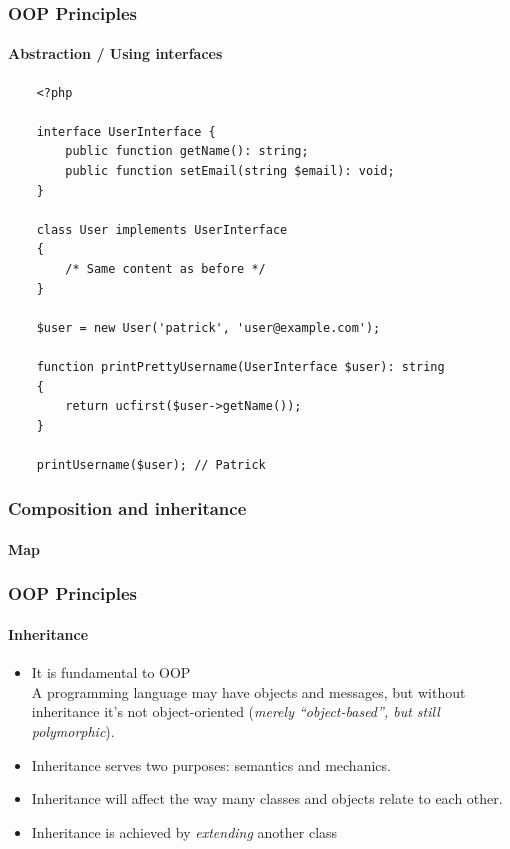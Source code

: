 \begin{frame}[fragile,c]
    \frametitle{OOP Principles}
    \framesubtitle{Abstraction / Using interfaces}

    \begin{lstlisting}
    <?php

    interface UserInterface {
        public function getName(): string;
        public function setEmail(string $email): void;
    }

    class User implements UserInterface
    {
        /* Same content as before */
    }

    $user = new User('patrick', 'user@example.com');

    function printPrettyUsername(UserInterface $user): string
    {
        return ucfirst($user->getName());
    }

    printUsername($user); // Patrick
    \end{lstlisting}
\end{frame}

\begin{frame}[fragile,c]
    \frametitle{Composition and inheritance}
    \framesubtitle{Map}

\end{frame}

\begin{frame}
    \frametitle{OOP Principles}
    \framesubtitle{Inheritance}

    \begin{itemize}
        \item It is fundamental to OOP\pause
              \\\textcolor{ecgrey!50}{A programming language may have objects and messages, but without inheritance it's not object-oriented (\textit{merely “object-based”, but still polymorphic}).}
        \pause
        \item Inheritance serves two purposes: semantics and mechanics.
        \pause
        \item Inheritance will affect the way many classes and objects relate to each other.
        \pause
        \item Inheritance is achieved by \textit{extending} another class
    \end{itemize}
\end{frame}


